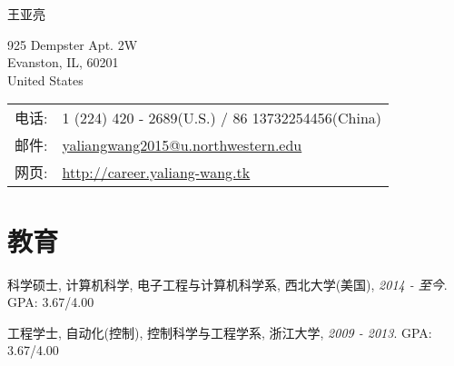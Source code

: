 \documentclass[letterpaper]{article}
\def\name{王亚亮}
\renewenvironment{itemize}{
  \begin{list}{}{
    \setlength{\leftmargin}{1.5em}
  }
}{
  \end{list}
}
\begin{document}
{\huge \name}


\vspace{0.25in}

\begin{minipage}{0.45\linewidth}
  925 Dempster Apt. 2W \\
  Evanston, IL, 60201 \\
  United States 
  
\end{minipage}
\begin{minipage}{0.45\linewidth}
  \begin{tabular}{ll}
    电话: & 1 (224) 420 - 2689(U.S.) / 86 13732254456(China) \\
    邮件: & \href{mailto:yaliangwang2015@u.northwestern.edu}{yaliangwang2015@u.northwestern.edu} \\
    网页: & \href{http://career.yaliang-wang.tk}{http://career.yaliang-wang.tk} \\
  \end{tabular}
\end{minipage}


%

%

\section*{教育}

\begin{itemize}
  \item 科学硕士, 计算机科学, 电子工程与计算机科学系, 西北大学(美国), {\it 2014 - 至今}. {\color[rgb]{0.2, 0.7, 0.7} GPA: 3.67/4.00}
  \item 工程学士, 自动化(控制), 控制科学与工程学系, 浙江大学, {\it 2009 - 2013}. {\color[rgb]{0.2, 0.7, 0.7} GPA: 3.67/4.00}
\end{itemize}
\end{document}
